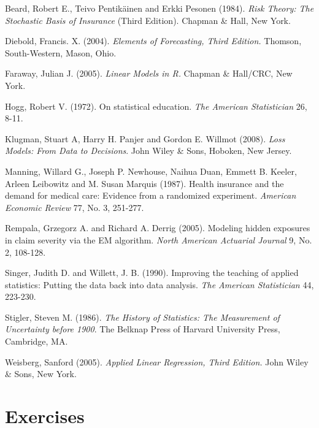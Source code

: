 \begin{multicols}{2}


Beard, Robert E.,  Teivo Pentik\"{a}inen and Erkki Pesonen (1984).
\textit{Risk Theory: The Stochastic Basis of Insurance} (Third
Edition). Chapman \& Hall, New York.

Diebold, Francis. X. (2004). \textit{Elements of Forecasting, Third
Edition.} Thomson, South-Western, Mason, Ohio.

Faraway, Julian J. (2005). \textit{Linear Models in R.} Chapman \&
Hall/CRC, New York.

Hogg, Robert V. (1972). On statistical education. \textit{The
American Statistician} 26, 8-11.

Klugman, Stuart A, Harry H. Panjer and Gordon E. Willmot (2008).
\emph{Loss Models: From Data to Decisions}. John Wiley \& Sons,
Hoboken, New Jersey.

Manning, Willard G., Joseph P. Newhouse, Naihua Duan, Emmett B.
Keeler, Arleen Leibowitz and M. Susan Marquis (1987). Health
insurance and the demand for medical care: Evidence from a
randomized experiment. \textit{American Economic Review} 77, No. 3,
251-277.

Rempala, Grzegorz A. and Richard A. Derrig (2005). Modeling hidden
exposures in claim severity via the EM algorithm. \textit{North
American Actuarial Journal} 9, No. 2, 108-128.

Singer, Judith D. and Willett, J. B. (1990). Improving the teaching
of applied statistics:  Putting the data back into data analysis.
\textit{The American Statistician} 44, 223-230.

Stigler, Steven M. (1986). \textit{The History of Statistics:  The
Measurement of Uncertainty before 1900}. The Belknap Press of
Harvard University Press, Cambridge, MA.

Weisberg, Sanford (2005). \textit{Applied Linear Regression, Third
Edition.} John Wiley \& Sons, New York.



\end{multicols}

\section{Exercises}



